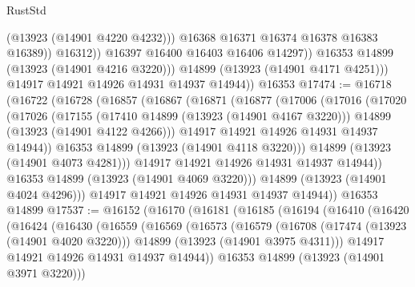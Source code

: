 \begin{lexlean}{RustStd}
\begin{coremodule}
{\begin{coremodule}
{{{{{{{{{{{{{{{{{{{{{{{{{{{{{{{{{{{{{                          (@13923 (@14901 @4220 @4232)))
                        @16368
                        @16371
                        @16374
                        @16378
                        @16383
                        @16389))
                    @16312))
                @16397
                @16400
                @16403
                @16406
                @14297))
            @16353
            @14899
            (@13923 (@14901 @4216 @3220)))
          @14899
          (@13923 (@14901 @4171 @4251)))
        @14917
        @14921
        @14926
        @14931
        @14937
        @14944))
    @16353
@17474 := @16718
    (@16722
      (@16728
        (@16857
          (@16867
            (@16871
              (@16877
                (@17006
                  (@17016
                    (@17020
                      (@17026
                        (@17155
                          (@17410 @14899 (@13923 (@14901 @4167 @3220)))
                          @14899
                          (@13923 (@14901 @4122 @4266)))
                        @14917
                        @14921
                        @14926
                        @14931
                        @14937
                        @14944))
                    @16353
                    @14899
                    (@13923 (@14901 @4118 @3220)))
                  @14899
                  (@13923 (@14901 @4073 @4281)))
                @14917
                @14921
                @14926
                @14931
                @14937
                @14944))
            @16353
            @14899
            (@13923 (@14901 @4069 @3220)))
          @14899
          (@13923 (@14901 @4024 @4296)))
        @14917
        @14921
        @14926
        @14931
        @14937
        @14944))
    @16353
    @14899
@17537 := @16152
    (@16170
      (@16181
        (@16185
          (@16194
            (@16410
              (@16420
                (@16424
                  (@16430
                    (@16559
                      (@16569
                        (@16573
                          (@16579
                            (@16708
                              (@17474 (@13923 (@14901 @4020 @3220)))
                              @14899
                              (@13923 (@14901 @3975 @4311)))
                            @14917
                            @14921
                            @14926
                            @14931
                            @14937
                            @14944))
                        @16353
                        @14899
                        (@13923 (@14901 @3971 @3220)))
}}}}}}}}}}}}}}}}}}}}}}}}}}}}}}}}}}}}}
\end{coremodule}}
\end{coremodule}
\end{lexlean}

